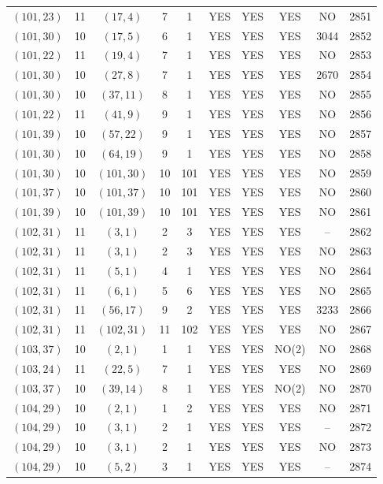 \begin{longtable}{|c|c|c|c|c|c|c|c|c|c|}
$(101, 23)$ & 11 & $(17, 4)$ & 7 & 1 & YES & YES & YES & NO & 2851\\
$(101, 30)$ & 10 & $(17, 5)$ & 6 & 1 & YES & YES & YES & 3044 & 2852\\
$(101, 22)$ & 11 & $(19, 4)$ & 7 & 1 & YES & YES & YES & NO & 2853\\
$(101, 30)$ & 10 & $(27, 8)$ & 7 & 1 & YES & YES & YES & 2670 & 2854\\
$(101, 30)$ & 10 & $(37, 11)$ & 8 & 1 & YES & YES & YES & NO & 2855\\
$(101, 22)$ & 11 & $(41, 9)$ & 9 & 1 & YES & YES & YES & NO & 2856\\
$(101, 39)$ & 10 & $(57, 22)$ & 9 & 1 & YES & YES & YES & NO & 2857\\
$(101, 30)$ & 10 & $(64, 19)$ & 9 & 1 & YES & YES & YES & NO & 2858\\
$(101, 30)$ & 10 & $(101, 30)$ & 10 & 101 & YES & YES & YES & NO & 2859\\
$(101, 37)$ & 10 & $(101, 37)$ & 10 & 101 & YES & YES & YES & NO & 2860\\
$(101, 39)$ & 10 & $(101, 39)$ & 10 & 101 & YES & YES & YES & NO & 2861\\
$(102, 31)$ & 11 & $(3, 1)$ & 2 & 3 & YES & YES & YES & -- & 2862\\
$(102, 31)$ & 11 & $(3, 1)$ & 2 & 3 & YES & YES & YES & NO & 2863\\
$(102, 31)$ & 11 & $(5, 1)$ & 4 & 1 & YES & YES & YES & NO & 2864\\
$(102, 31)$ & 11 & $(6, 1)$ & 5 & 6 & YES & YES & YES & NO & 2865\\
$(102, 31)$ & 11 & $(56, 17)$ & 9 & 2 & YES & YES & YES & 3233 & 2866\\
$(102, 31)$ & 11 & $(102, 31)$ & 11 & 102 & YES & YES & YES & NO & 2867\\
$(103, 37)$ & 10 & $(2, 1)$ & 1 & 1 & YES & YES & NO(2) & NO & 2868\\
$(103, 24)$ & 11 & $(22, 5)$ & 7 & 1 & YES & YES & YES & NO & 2869\\
$(103, 37)$ & 10 & $(39, 14)$ & 8 & 1 & YES & YES & NO(2) & NO & 2870\\
$(104, 29)$ & 10 & $(2, 1)$ & 1 & 2 & YES & YES & YES & NO & 2871\\
$(104, 29)$ & 10 & $(3, 1)$ & 2 & 1 & YES & YES & YES & -- & 2872\\
$(104, 29)$ & 10 & $(3, 1)$ & 2 & 1 & YES & YES & YES & NO & 2873\\
$(104, 29)$ & 10 & $(5, 2)$ & 3 & 1 & YES & YES & YES & -- & 2874\\

\end{longtable}
